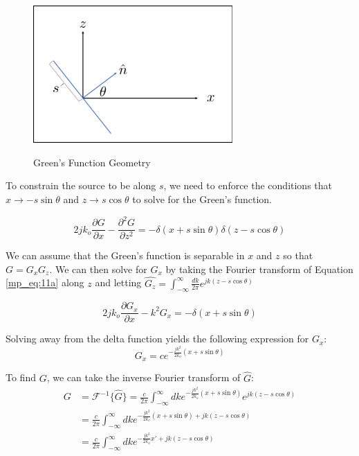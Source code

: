 \begin{figure}[H]
  \begin{center}
\includegraphics[width=3in]{../media/analysis/gf_geometry.png}
  \end{center}
  \renewcommand{\baselinestretch}{1} \small\normalsize
  \begin{quote}
    \caption[Green's Function Geometry ]{Green's Function Geometry\label{mp_fig:2a}}
  \end{quote}
\end{figure}
\renewcommand{\baselinestretch}{2} \small\normalsize

To constrain the source to be along $s$, we need to enforce the conditions that $x\rightarrow -s\sin\theta$ and $z\rightarrow s\cos\theta$ to solve for the Green's function.

\begin{equation}
2jk_o \frac{\partial G}{\partial x} - \frac{\partial^2 G}{\partial z^2} = -\delta(x + s \sin\theta)\delta(z - s \cos\theta)
\label{mp_eq:11a}
\end{equation}

We can assume that the Green's function is separable in $x$ and $z$ so that $G = G_xG_z$. We can then solve for $G_x$ by taking the Fourier transform of Equation \ref{mp_eq:11a} along $z$ and letting $\hat{G_z} = \int_{-\infty}^{\infty}\frac{dk}{2\pi}e^{jk(z - s\cos\theta)}$

\begin{equation}
2jk_o\frac{\partial G_x}{\partial x} -k^2G_x = -\delta(x + s\sin\theta)
\label{mp_eq:11b}
\end{equation}

Solving away from the delta function yields the following expression for $G_x$:
\begin{equation}
\boxed{G_x = ce^{-\frac{jk^2}{2k_o}(x+s\sin\theta)}}
\label{mp_eq:11c}
\end{equation}

To find $G$, we can take the inverse Fourier transform of $\hat{G}$:
\begin{equation}
\begin{aligned}
G &= \mathcal{F}^{-1}\{\hat{G}\} = \frac{c}{2\pi}\int_{-\infty}^{\infty}dk e^{-\frac{jk^2}{2k_o}(x+s\sin\theta)}e^{jk(z-s\cos\theta)} \\
& = \frac{c}{2\pi}\int_{-\infty}^{\infty}dk e^{-\frac{jk^2}{2k_o}(x+s\sin\theta) +jk(z-s\cos\theta)} \\
& = \frac{c}{2\pi}\int_{-\infty}^{\infty}dk e^{-\frac{jk^2}{2k_o}x'+jk(z-s\cos\theta)} \\
\end{aligned}
\label{mp_eq:11d}
\end{equation}


